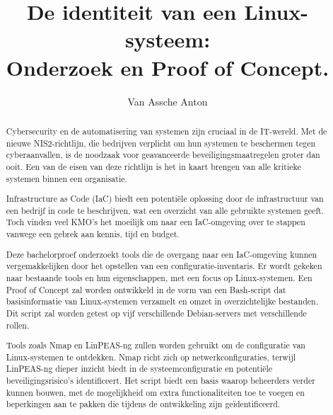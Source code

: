 \documentclass[a0,portrait]{hogent-poster}
\title{De identiteit van een Linux-systeem:\\ Onderzoek en Proof of Concept.}
\author{Van Assche Anton}
\begin{document}
\maketitle

\begin{abstract}
Cybersecurity en de automatisering van systemen zijn cruciaal in de IT-wereld.
Met de nieuwe NIS2-richtlijn, die bedrijven verplicht om hun systemen te beschermen tegen cyberaanvallen, is de noodzaak voor geavanceerde beveiligingsmaatregelen groter dan ooit.
Een van de eisen van deze richtlijn is het in kaart brengen van alle kritieke systemen binnen een organisatie.

Infrastructure as Code (IaC) biedt een potenti\"ele oplossing door de infrastructuur van een bedrijf in code te beschrijven, wat een overzicht van alle gebruikte systemen geeft.
Toch vinden veel KMO's het moeilijk om naar een IaC-omgeving over te stappen vanwege een gebrek aan kennis, tijd en budget.

Deze bachelorproef onderzoekt tools die de overgang naar een IaC-omgeving kunnen vergemakkelijken door het opstellen van een configuratie-inventaris.
Er wordt gekeken naar bestaande tools en hun eigenschappen, met een focus op Linux-systemen.
Een Proof of Concept zal worden ontwikkeld in de vorm van een Bash-script dat basisinformatie van Linux-systemen verzamelt en omzet in overzichtelijke bestanden.
Dit script zal worden getest op vijf verschillende Debian-servers met verschillende rollen.

Tools zoals Nmap en LinPEAS-ng zullen worden gebruikt om de configuratie van Linux-systemen te ontdekken.
Nmap richt zich op netwerkconfiguraties, terwijl LinPEAS-ng dieper inzicht biedt in de systeemconfiguratie en potenti\"ele beveiligingsrisico's identificeert.
Het script biedt een basis waarop beheerders verder kunnen bouwen, met de mogelijkheid om extra functionaliteiten toe te voegen en beperkingen aan te pakken die tijdens de ontwikkeling zijn ge\"identificeerd.

\end{abstract}
\end{document}

